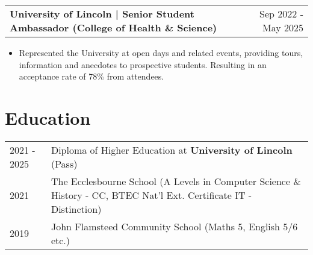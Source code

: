 \documentclass[a4paper,12pt]{article}
\makeatletter
\newenvironment{joblong}[2]
    {
    \begin{tabularx}{\linewidth}{@{}l X r@{}}
    \textbf{#1} & \hfill &  #2 \\[3.75pt]
    \end{tabularx}
    \begin{minipage}[t]{\linewidth}
    \begin{itemize}[nosep,after=\strut, leftmargin=1em, itemsep=3pt,label=--]
    }
    {
    \end{itemize}
    \end{minipage}    
    }
\makeatother
\begin{document}
\begin{joblong}{University of Lincoln | Senior Student Ambassador (College of Health \& Science)}{Sep 2022 - May 2025}
\item Represented the University at open days and related events, providing tours, information and anecdotes to prospective students. Resulting in an acceptance rate of 78\% from attendees.
\end{joblong}



\section{Education}
\begin{tabularx}{\linewidth}{@{}l X@{}}	
2021 - 2025 & Diploma of Higher Education at \textbf{University of Lincoln} \hfill (Pass) \\ 

2021 & The Ecclesbourne School  (A Levels in Computer Science \& History - CC, BTEC Nat'l Ext. Certificate IT - Distinction) \\

2019 & John Flamsteed Community School \hfill  (Maths 5, English 5/6 etc.) \\
\end{tabularx}

\end{document}

